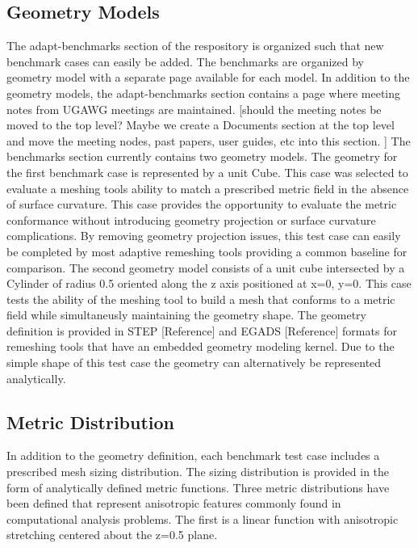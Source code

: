 \documentclass[3p,times,procedia,number]{elsarticle}
\begin{document}
\subsection{Geometry Models}
The adapt-benchmarks section of the respository is organized such that new benchmark cases can easily be added.   The benchmarks are organized by geometry model with a separate page available for each model.      In addition to the geometry models, the adapt-benchmarks section contains a page where meeting notes from UGAWG meetings are maintained. {\color{red}[should the meeting notes be moved to the top level?  Maybe we create a Documents section at the top level and move the meeting nodes, past papers, user guides, etc into this section. ]}  The benchmarks section currently contains two geometry models.  The geometry for the first benchmark case is represented by a unit Cube.   This case was selected to evaluate a meshing tools ability to match a prescribed metric field in the absence of surface curvature.   This case provides the opportunity to evaluate the metric conformance without introducing geometry projection or surface curvature complications.    By removing geometry projection issues, this test case can easily be completed by most adaptive remeshing tools providing a common baseline for comparison.  The second geometry model consists of a unit cube intersected by a Cylinder of radius 0.5 oriented along the z axis positioned at x=0, y=0.  This case tests the ability of the meshing tool to build a mesh that conforms to a metric field while simultaneusly maintaining the geometry shape.   The geometry definition is provided in STEP{\color{red} [Reference]} and EGADS {\color{red} [Reference]} formats for remeshing tools that have an embedded geometry modeling kernel.   Due to the simple shape of this test case the geometry can alternatively be represented analytically.   

\subsection{Metric Distribution}
In addition to the geometry definition, each benchmark test case includes a prescribed mesh sizing distribution.  The sizing distribution is provided in the form of analytically defined metric functions.   Three metric distributions have been defined that represent anisotropic features commonly found in computational analysis problems.  The first is a linear function with anisotropic stretching centered about the z=0.5 plane.
\end{document}
